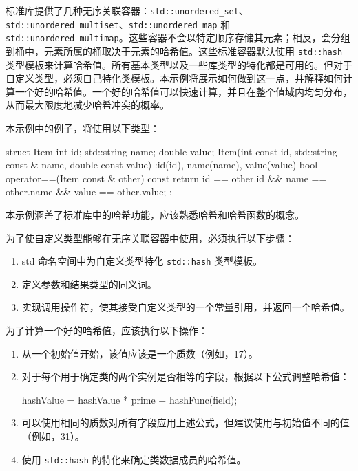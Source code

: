 
标准库提供了几种无序关联容器：\verb|std::unordered_set|、\verb|std::unordered_multiset|、\verb|std::unordered_map| 和 \verb|std::unordered_multimap|。这些容器不会以特定顺序存储其元素；相反，会分组到桶中，元素所属的桶取决于元素的哈希值。这些标准容器默认使用 \verb|std::hash| 类型模板来计算哈希值。所有基本类型以及一些库类型的特化都是可用的。但对于自定义类型，必须自己特化类模板。本示例将展示如何做到这一点，并解释如何计算一个好的哈希值。一个好的哈希值可以快速计算，并且在整个值域内均匀分布，从而最大限度地减少哈希冲突的概率。


本示例中的例子，将使用以下类型：

\begin{cpp}
struct Item
{
    int         id;
    std::string name;
    double      value;
    Item(int const id, std::string const & name, double const value)
        :id(id), name(name), value(value)
    {}
    bool operator==(Item const & other) const
    {
        return id == other.id && name == other.name &&
        value == other.value;
    }
};
\end{cpp}

本示例涵盖了标准库中的哈希功能，应该熟悉哈希和哈希函数的概念。


为了使自定义类型能够在无序关联容器中使用，必须执行以下步骤：

\begin{enumerate}
\item
std 命名空间中为自定义类型特化 \verb|std::hash| 类型模板。

\item
定义参数和结果类型的同义词。

\item
实现调用操作符，使其接受自定义类型的一个常量引用，并返回一个哈希值。
\end{enumerate}

为了计算一个好的哈希值，应该执行以下操作：

\begin{enumerate}
\item
从一个初始值开始，该值应该是一个质数（例如，17）。

\item
对于每个用于确定类的两个实例是否相等的字段，根据以下公式调整哈希值：

\begin{cpp}
hashValue = hashValue * prime + hashFunc(field);
\end{cpp}

\item
可以使用相同的质数对所有字段应用上述公式，但建议使用与初始值不同的值（例如，31）。

\item
使用 \verb|std::hash| 的特化来确定类数据成员的哈希值。
\end{enumerate}


